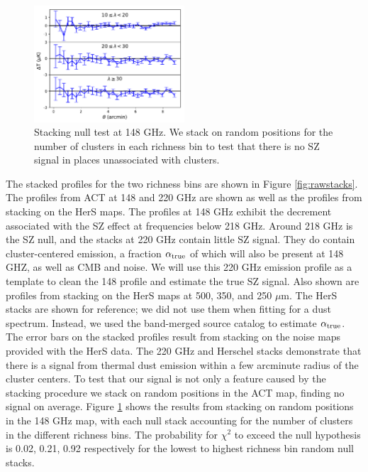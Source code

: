 \documentclass[a4paper,fleqn,usenatbib]{mnras}
\begin{document}
\begin{figure}
  \centering
  \includegraphics[width=0.5\textwidth]{rand_stacks_tophat.pdf}

\caption{Stacking null test at 148 GHz. We stack on random positions for the number of clusters in each richness bin to test that there is no SZ signal in places unassociated with clusters.}  
  \label{fig:randstacks}
\end{figure}




The stacked profiles for the two richness bins are shown in Figure \ref{fig:rawstacks}. The profiles from ACT at 148 and 220 GHz are shown as well as the profiles from stacking on the HerS maps. The profiles at 148 GHz exhibit the decrement associated with the SZ effect at frequencies below 218 GHz. Around 218 GHz is the SZ null, and the stacks at 220 GHz contain little SZ signal. They do contain cluster-centered emission, a fraction $\alpha_{\rm true}$ of which will also be present at 148 GHZ, as well as CMB and noise. We will use this 220 GHz emission profile as a template to clean the 148 profile and estimate the true SZ signal. Also shown are profiles from stacking on the HerS maps at 500, 350, and 250 $\mu$m. The HerS stacks are shown for reference; we did not use them when fitting for a dust spectrum. Instead, we used the band-merged source catalog \citep{2014ApJS..210...22V} to estimate $\alpha_{\rm true}$. The error bars on the stacked profiles result from stacking on the noise maps provided with the HerS data. The 220 GHz and Herschel stacks demonstrate that there is a signal from thermal dust emission within a few arcminute radius of the cluster centers.
To test that our signal is not only a feature caused by the stacking procedure we stack on random positions in the ACT map, finding no signal on average. Figure \ref{fig:randstacks} shows the results from stacking on random positions in the 148 GHz map, with each null stack accounting for the number of clusters in the different richness bins. The probability for $\chi^2$ to exceed the null hypothesis is 0.02, 0.21, 0.92 respectively for the lowest to highest richness bin random null stacks.
\end{document}
